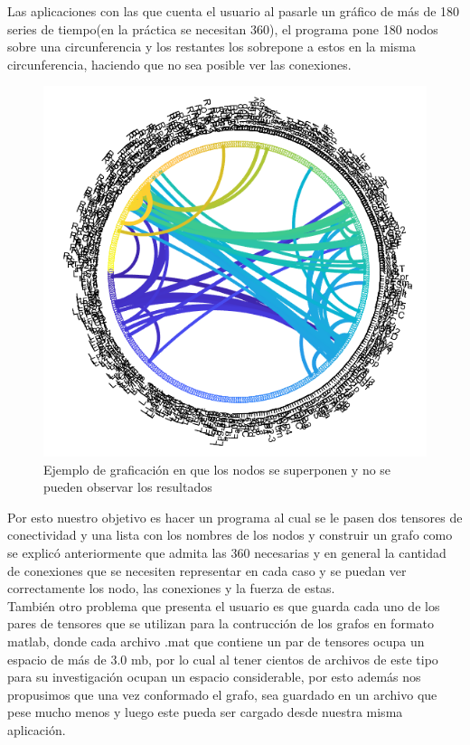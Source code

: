 \documentclass[a4paper,10pt,twocolumn]{article}
\begin{document}
\newpage


Las aplicaciones con las que cuenta el usuario al pasarle un gráfico de más de 180 series
de tiempo(en la práctica se necesitan 360), el programa pone 180 nodos sobre una circunferencia
y los restantes los sobrepone a estos en la misma circunferencia, haciendo que no sea posible
ver las conexiones.\\


\begin{figure}[h!]%
\center
\includegraphics[scale=0.3]{example2.png}
\caption{Ejemplo de graficación en que los nodos se superponen y no se pueden observar los resultados}
\end{figure}
 
 
Por esto nuestro objetivo es hacer un programa al cual se le pasen dos tensores de conectividad y una lista con los nombres de los nodos y construir un grafo como se explicó anteriormente que admita las 360 necesarias y en general la cantidad de conexiones que se necesiten representar en cada caso y se puedan ver correctamente los nodo, las conexiones y la fuerza de estas. \\

También otro problema que presenta el usuario es que guarda cada uno de los pares de tensores que se utilizan para la contrucción de los grafos en formato matlab, donde cada archivo .mat que contiene un par de tensores ocupa un espacio de más de 3.0 mb, por lo cual al tener cientos de archivos de este tipo para su investigación ocupan un espacio considerable, por esto además nos propusimos que una vez conformado el grafo, sea guardado en un archivo que pese mucho menos y luego este pueda ser cargado desde nuestra misma aplicación. 
\end{document}
